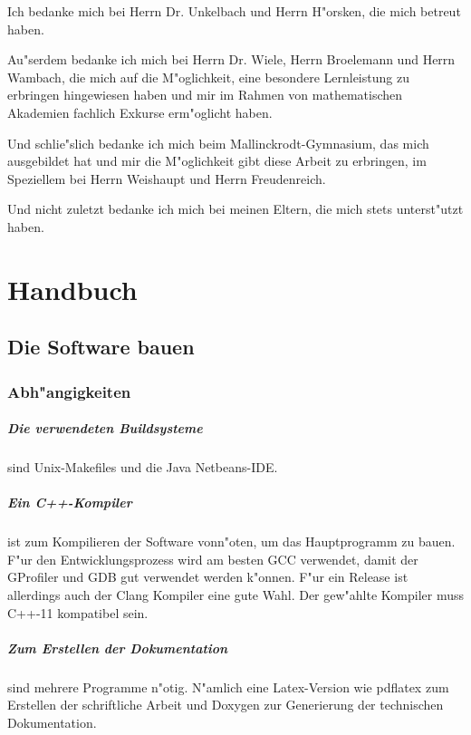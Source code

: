 \documentclass[14pt, a4paper]{report}
\begin{document}
Ich bedanke mich bei Herrn Dr. Unkelbach und Herrn H"orsken, 
die mich betreut haben. 

Au"serdem bedanke ich mich bei Herrn Dr. Wiele, Herrn Broelemann und Herrn Wambach, 
die mich auf die M"oglichkeit, eine besondere Lernleistung zu erbringen hingewiesen 
haben und mir im
Rahmen von mathematischen Akademien fachlich Exkurse erm"oglicht haben. 

Und schlie"slich bedanke ich mich beim Mallinckrodt-Gymnasium, das mich ausgebildet hat und mir die M"oglichkeit
gibt diese Arbeit zu erbringen, im Speziellem bei Herrn Weishaupt und Herrn
Freudenreich. 

Und nicht zuletzt bedanke ich mich bei meinen Eltern, die mich stets unterst"utzt haben.
 


\appendix
\chapter{Handbuch}
\section{Die Software bauen}

\subsection{Abh"angigkeiten}
\paragraph{Die verwendeten Buildsysteme} sind Unix-Makefiles und die Java Netbeans-IDE.  
\paragraph{Ein C++-Kompiler} ist zum Kompilieren der Software vonn"oten, um das 
Hauptprogramm zu bauen. F"ur den Entwicklungsprozess wird am besten GCC verwendet, damit
der GProfiler und GDB gut verwendet werden k"onnen. F"ur ein Release ist allerdings auch
der Clang Kompiler eine gute Wahl. Der gew"ahlte Kompiler muss C++-11 kompatibel sein.

\paragraph{Zum Erstellen der Dokumentation} sind mehrere Programme n"otig. N"amlich
eine Latex-Version wie pdflatex zum Erstellen der schriftliche Arbeit und Doxygen zur
Generierung der technischen Dokumentation.
\end{document}
